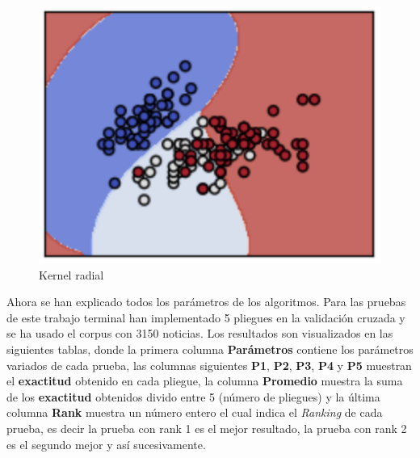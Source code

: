 \begin{figure}[H]
\centering
\includegraphics[scale=0.8]{imagenes/capitulo5/Entrenamiento/krbf.png}
\caption{Kernel radial \citep{CC1}}
\label{fig:cp5:krbf}
\end{figure}


Ahora se han explicado todos los parámetros de los algoritmos. Para las pruebas de este trabajo terminal han implementado 5 pliegues en la validación cruzada y se ha usado el corpus con 3150 noticias. Los resultados son visualizados en las siguientes tablas, donde la primera columna \textbf{Parámetros} contiene los parámetros variados de cada prueba, las columnas siguientes \textbf{P1}, \textbf{P2}, \textbf{P3}, \textbf{P4} y \textbf{P5} muestran el \textbf{exactitud} obtenido en cada pliegue, la columna \textbf{Promedio} muestra la suma de los \textbf{exactitud} obtenidos divido entre 5 (número de pliegues) y la última columna \textbf{Rank} muestra un número entero el cual indica el \textit{Ranking} de cada prueba, es decir la prueba con rank 1 es el mejor resultado, la prueba con rank 2 es el segundo mejor y así sucesivamente.\\

